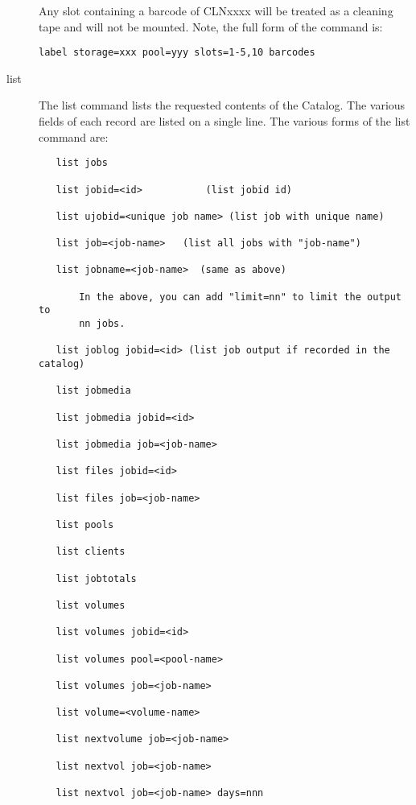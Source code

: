 \begin{description}
\begin{verbatim}
\end{verbatim}
\normalsize

Any slot containing a barcode of CLNxxxx will be treated as a cleaning tape
and will not be mounted.  Note, the full form of the command is:

\footnotesize
\begin{verbatim}
label storage=xxx pool=yyy slots=1-5,10 barcodes
\end{verbatim}
\normalsize

\item [list]
   The list command lists the requested contents of the Catalog.  The
   various fields of each record are listed on a single line.  The various
   forms of the list command are:
\footnotesize
\begin{verbatim}
   list jobs

   list jobid=<id>           (list jobid id)

   list ujobid=<unique job name> (list job with unique name)

   list job=<job-name>   (list all jobs with "job-name")

   list jobname=<job-name>  (same as above)

       In the above, you can add "limit=nn" to limit the output to
       nn jobs.

   list joblog jobid=<id> (list job output if recorded in the catalog)

   list jobmedia

   list jobmedia jobid=<id>

   list jobmedia job=<job-name>

   list files jobid=<id>

   list files job=<job-name>

   list pools

   list clients

   list jobtotals

   list volumes

   list volumes jobid=<id>

   list volumes pool=<pool-name>

   list volumes job=<job-name>

   list volume=<volume-name>

   list nextvolume job=<job-name>

   list nextvol job=<job-name>

   list nextvol job=<job-name> days=nnn

\end{verbatim}
\normalsize


\end{description}
